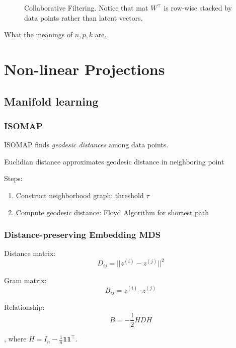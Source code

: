 \documentclass[a4paper]{report}
\begin{document}
\begin{figure}[!htp]
\centering
{}
\caption{Collaborative Filtering. Notice that mat $W^\top$ is row-wise stacked by data points rather than latent vectors. }
\label{fig:collaborativeFiltering}
\end{figure}

What the meanings of $n, p, k$ are. 


\chapter{Non-linear Projections}
\section{Manifold learning}
\subsection{ISOMAP}
ISOMAP finds \textit{geodesic distances} among data points.

Euclidian distance approximates geodesic distance in neighboring point 

Steps:
\begin{enumerate}
\item Construct neighborhood graph: threshold $\tau$
\item Compute geodesic distance: Floyd Algorithm for shortest path
\end{enumerate}

\subsection{Distance-preserving Embedding MDS} 
Distance matrix:
$$
D_{ij} = ||z^{(i)}-z^{(j)}||^2
$$

Gram matrix:
$$
B_{ij} = z^{(i)}\cdot z^{(j)}
$$

Relationship:
$$
B = -\frac{1}{2} HDH
$$

, where $H=I_n - \frac{1}{n}\boldsymbol1\boldsymbol1^\top$.
\end{document}
